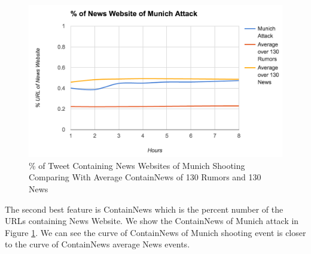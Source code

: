   \begin{figure}[!h]
\centering
\includegraphics[width=0.8\columnwidth]{images/munichNews.png}
\caption{\% of Tweet Containing News Websites of Munich Shooting Comparing With Average ContainNews of 130 Rumors and 130 News}
\label{fig:munichattackNews}
\end{figure}

The second best feature is ContainNews which is the percent number of the URLs containing News Website. We show the ContainNews of Munich attack in Figure \ref{fig:munichattackNews}. 
 We can see the curve of ContainNews of Munich shooting event is closer to the curve of ContainNews average News events. 
 
